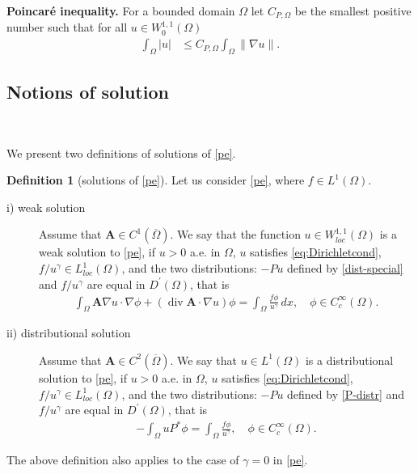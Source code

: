 \documentclass[12pt,a4paper]{amsart}
\theoremstyle{definition}
\newtheorem{definition}[theorem]{\bf Definition}
\newcommand{\A}{\mathbf{A}}
\newcommand*\Div{\operatorname{div}}
\begin{document}
\noindent\textbf{Poincar\'e inequality.} For a bounded domain $\Omega$ let $C_{P,\Omega}$ be the smallest positive number such that for all $u\in W^{1,1}_0(\Omega)$
\begin{align}
    \int_\Omega |u|&\leq C_{P,\Omega}\int_\Omega \|\nabla u\|. \label{eq:Poincare_1}
\end{align}


\subsection{Notions of solution} \

\smallskip
\noindent

We present two definitions of solutions of \eqref{pe}.


\begin{definition}[solutions of \eqref{pe}]
Let us consider \eqref{pe}, where $f\in L^1(\Omega)$.
\begin{description}
\item[i) weak solution]\label{def:weaksolution}
Assume that $\A\in C^1(\overline{\Omega})$.
 We say that the function
$u\in W^{1,1}_{loc}(\Omega)$ 
is a weak solution to \eqref{pe}, if $u>0$ a.e. in $\Omega$, $u$ satisfies \eqref{eq:Dirichletcond}, $f/u^\gamma \in L^1_{loc}(\Omega)$, and
the two distributions: $-Pu$ defined by \eqref{dist-special}  and $f/u^\gamma$ are equal in $D^{'}(\Omega)$, that is
\begin{align*}
    \int_\Omega \A\nabla u \cdot \nabla \phi + (\Div\A \cdot \nabla u )\phi  = \int_\Omega \frac{f\phi}{u^\gamma}\, dx, \quad  \phi\in C^\infty_c(\Omega).
\end{align*} 
\item[ii) distributional solution]\label{def:distributionalsolution}
Assume that $\A\in C^2(\overline{\Omega})$.
    We say that $u\in L^1(\Omega)$ is a distributional solution to \eqref{pe}, 
    if $u>0$ a.e. in $\Omega$, $u$ satisfies \eqref{eq:Dirichletcond}, $f/u^\gamma \in L^1_{loc}(\Omega)$, and the two distributions: $-Pu$ defined by \eqref{P-distr}  and $f/u^\gamma$ are equal in $D^{'}(\Omega)$, that is
    \begin{align}\label{eq:distributional}
        -\int_\Omega uP^*\phi = \int_\Omega \frac{f\phi}{u^\gamma},\quad  \phi\in C^\infty_c(\Omega).
    \end{align}
\end{description}
\end{definition}
\noindent The above definition also applies to the case of $\gamma=0$ in \eqref{pe}.
\end{document}

